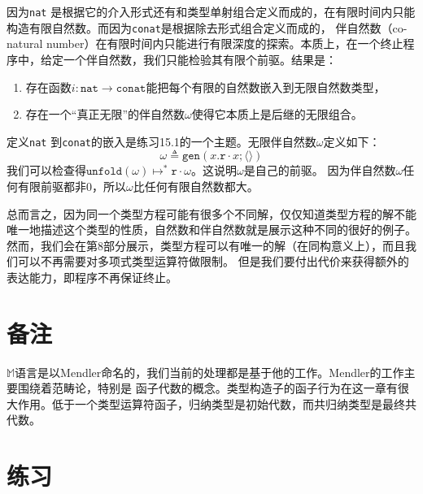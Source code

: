 因为\texttt{nat} 是根据它的介入形式还有和类型单射组合定义而成的，在有限时间内只能构造有限自然数。而因为\texttt{conat}是根据除去形式组合定义而成的，
伴自然数（co-natural number）在有限时间内只能进行有限深度的探索。本质上，在一个终止程序中，给定一个伴自然数，我们只能检验其有限个前驱。结果是：
\begin{enumerate}
	\item 存在函数$i:\texttt{nat}\rightarrow\texttt{conat}$能把每个有限的自然数嵌入到无限自然数类型，
	\item 存在一个“真正无限”的伴自然数$\omega$使得它本质上是后继的无限组合。
\end{enumerate}
定义\texttt{nat} 到\texttt{conat}的嵌入是练习15.1的一个主题。无限伴自然数$\omega$定义如下：
$$\omega\triangleq\texttt{gen}(x.\texttt{r}\cdot x;\langle\rangle)$$
我们可以检查得$\texttt{unfold}(\omega)\mapsto^*\texttt{r}\cdot\omega$。这说明$\omega$是自己的前驱。
因为伴自然数$\omega$任何有限前驱都非0，所以$\omega$比任何有限自然数都大。

总而言之，因为同一个类型方程可能有很多个不同解，仅仅知道类型方程的解不能唯一地描述这个类型的性质，自然数和伴自然数就是展示这种不同的很好的例子。
然而，我们会在第8部分展示，类型方程可以有唯一的解（在同构意义上），而且我们可以不再需要对多项式类型运算符做限制。
但是我们要付出代价来获得额外的表达能力，即程序不再保证终止。

\section{备注}

$\mathbb{M}$语言是以Mendler命名的，我们当前的处理都是基于他的工作。Mendler的工作主要围绕着范畴论，特别是
函子代数的概念。类型构造子的函子行为在这一章有很大作用。低于一个类型运算符函子，归纳类型是初始代数，而共归纳类型是最终共代数。

\section*{练习}

